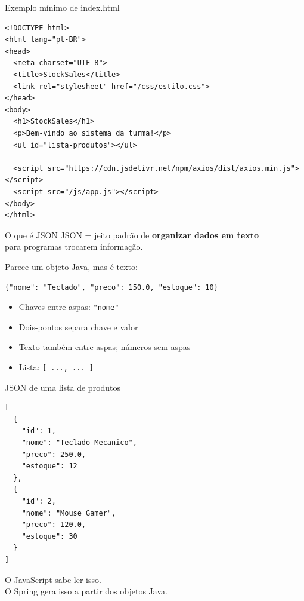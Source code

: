 \documentclass[aspectratio=169,11pt]{beamer}
\begin{document}
\begin{frame}[fragile]{Exemplo mínimo de index.html}
\begin{lstlisting}[basicstyle=\ttfamily\footnotesize]
<!DOCTYPE html>
<html lang="pt-BR">
<head>
  <meta charset="UTF-8">
  <title>StockSales</title>
  <link rel="stylesheet" href="/css/estilo.css">
</head>
<body>
  <h1>StockSales</h1>
  <p>Bem-vindo ao sistema da turma!</p>
  <ul id="lista-produtos"></ul>

  <script src="https://cdn.jsdelivr.net/npm/axios/dist/axios.min.js"></script>
  <script src="/js/app.js"></script>
</body>
</html>
\end{lstlisting}
\end{frame}

\begin{frame}{O que é JSON}
  JSON = jeito padrão de \textbf{organizar dados em texto}\\
  para programas trocarem informação.

  \vspace{0.6em}
  Parece um objeto Java, mas é texto:

  \vspace{0.4em}
  \begin{center}
  \texttt{\{"nome": "Teclado", "preco": 150.0, "estoque": 10\}}
  \end{center}

  \vspace{0.8em}
  \begin{itemize}
    \item Chaves entre aspas: \texttt{"nome"}
    \item Dois-pontos separa chave e valor
    \item Texto também entre aspas; números sem aspas
    \item Lista: \texttt{[ {...}, {...} ]}
  \end{itemize}
\end{frame}

\begin{frame}[fragile]{JSON de uma lista de produtos}
\begin{lstlisting}[basicstyle=\ttfamily\footnotesize]
[
  {
    "id": 1,
    "nome": "Teclado Mecanico",
    "preco": 250.0,
    "estoque": 12
  },
  {
    "id": 2,
    "nome": "Mouse Gamer",
    "preco": 120.0,
    "estoque": 30
  }
]
\end{lstlisting}

  O JavaScript sabe ler isso.\\
  O Spring gera isso a partir dos objetos Java.
\end{frame}
\end{document}
